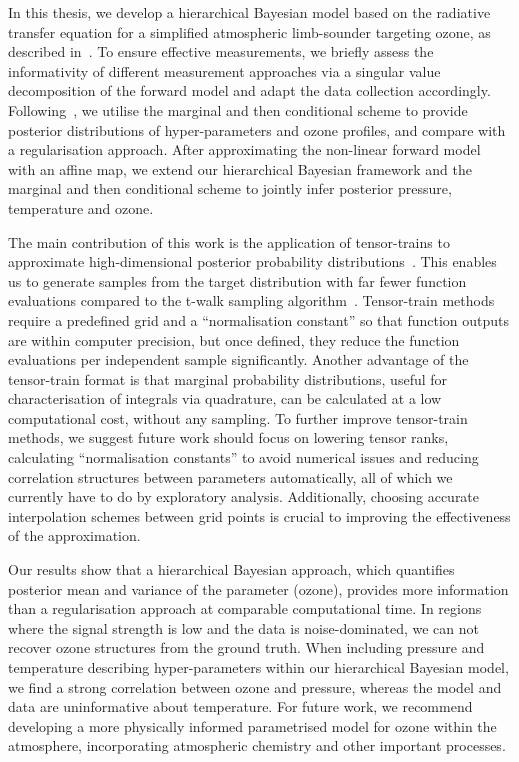 In this thesis, we develop a hierarchical Bayesian model based on the radiative transfer equation for a simplified atmospheric limb-sounder targeting ozone, as described in~\cite{mipas2000handbook}.
To ensure effective measurements, we briefly assess the informativity of different measurement approaches via a singular value decomposition of the forward model and adapt the data collection accordingly.
Following~\cite{fox2016fast}, we utilise the marginal and then conditional scheme to provide posterior distributions of hyper-parameters and ozone profiles, and compare with a regularisation approach.
After approximating the non-linear forward model with an affine map, we extend our hierarchical Bayesian framework and the marginal and then conditional scheme to jointly infer posterior pressure, temperature and ozone.

The main contribution of this work is the application of tensor-trains to approximate high-dimensional posterior probability distributions~\cite{cui2022deep, dolgov2020approximation}.
This enables us to generate samples from the target distribution with far fewer function evaluations compared to the t-walk sampling algorithm~\cite{christen2010general}.
Tensor-train methods require a predefined grid and a ``normalisation constant'' so that function outputs are within computer precision, but once defined, they reduce the function evaluations per independent sample significantly.
Another advantage of the tensor-train format is that marginal probability distributions, useful for characterisation of integrals via quadrature, can be calculated at a low computational cost, without any sampling.
To further improve tensor-train methods, we suggest future work should focus on lowering tensor ranks, calculating ``normalisation constants'' to avoid numerical issues and reducing correlation structures between parameters automatically, all of which we currently have to do by exploratory analysis.
Additionally, choosing accurate interpolation schemes between grid points is crucial to improving the effectiveness of the approximation.

Our results show that a hierarchical Bayesian approach, which quantifies posterior mean and variance of the parameter (ozone), provides more information than a regularisation approach at comparable computational time.
In regions where the signal strength is low and the data is noise-dominated, we can not recover ozone structures from the ground truth.
When including pressure and temperature describing hyper-parameters within our hierarchical Bayesian model, we find a strong correlation between ozone and pressure, whereas the model and data are uninformative about temperature.
For future work, we recommend developing a more physically informed parametrised model for ozone within the atmosphere, incorporating atmospheric chemistry and other important processes.
